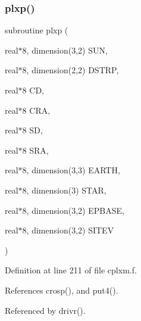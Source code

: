 \subsubsection{\texorpdfstring{plxp()}{plxp()}}
{\footnotesize\ttfamily subroutine plxp (\begin{DoxyParamCaption}\item[{real$\ast$8, dimension(3,2)}]{S\+UN,  }\item[{real$\ast$8, dimension(2,2)}]{D\+S\+T\+RP,  }\item[{real$\ast$8}]{CD,  }\item[{real$\ast$8}]{C\+RA,  }\item[{real$\ast$8}]{SD,  }\item[{real$\ast$8}]{S\+RA,  }\item[{real$\ast$8, dimension(3,3)}]{E\+A\+R\+TH,  }\item[{real$\ast$8, dimension(3)}]{S\+T\+AR,  }\item[{real$\ast$8, dimension(3,2)}]{E\+P\+B\+A\+SE,  }\item[{real$\ast$8, dimension(3,2)}]{S\+I\+T\+EV }\end{DoxyParamCaption})}



Definition at line 211 of file cplxm.\+f.



References crosp(), and put4().



Referenced by drivr().

